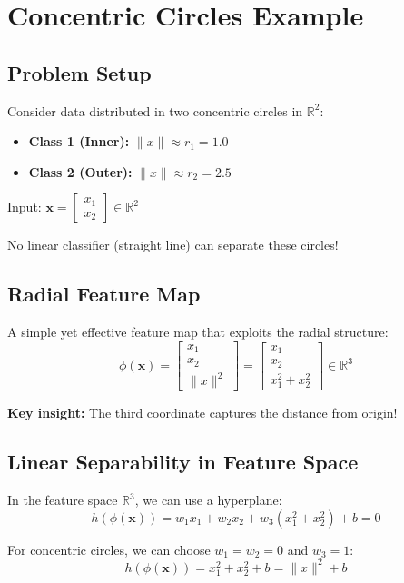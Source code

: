 \documentclass{tufte-handout}
\begin{document}
\section{Concentric Circles Example}

\subsection{Problem Setup}
Consider data distributed in two concentric circles in $\mathbb{R}^2$:
\begin{itemize}
    \item \textbf{Class 1 (Inner):} $\|x\| \approx r_1 = 1.0$
    \item \textbf{Class 2 (Outer):} $\|x\| \approx r_2 = 2.5$
\end{itemize}

Input: $\mathbf{x} = \begin{bmatrix} x_1 \\ x_2 \end{bmatrix} \in \mathbb{R}^2$

No linear classifier (straight line) can separate these circles!

\subsection{Radial Feature Map}
A simple yet effective feature map that exploits the radial structure:
\[
\phi(\mathbf{x}) = \begin{bmatrix} x_1 \\ x_2 \\ \|x\|^2 \end{bmatrix} 
= \begin{bmatrix} x_1 \\ x_2 \\ x_1^2 + x_2^2 \end{bmatrix} \in \mathbb{R}^3
\]

\textbf{Key insight:} The third coordinate captures the distance from origin!

\subsection{Linear Separability in Feature Space}
In the feature space $\mathbb{R}^3$, we can use a hyperplane:
\[
h(\phi(\mathbf{x})) = w_1 x_1 + w_2 x_2 + w_3(x_1^2 + x_2^2) + b = 0
\]

For concentric circles, we can choose $w_1 = w_2 = 0$ and $w_3 = 1$:
\[
h(\phi(\mathbf{x})) = x_1^2 + x_2^2 + b = \|x\|^2 + b
\]
\end{document}
